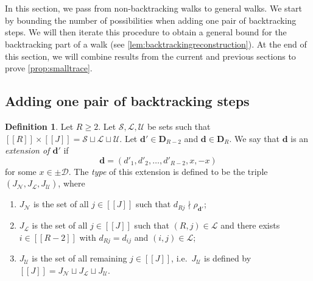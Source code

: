 \documentclass[11pt]{amsart}
\theoremstyle{definition}
\newtheorem{definition}[theorem]{Definition}
\renewcommand{\geq}{\geqslant}
\newcommand{\sinterval}[1]{[\![#1]\!] }
\newcommand{\D}{\mathcal{D}}
\renewcommand{\d}{\boldsymbol{d}}
\newcommand{\pcomp}[2]{d_{#1#2}}
\newcommand{\fprod}[1]{\rho_{#1}}
\newcommand{\pallprime}{\fprod{\d'}}
\newcommand{\lit}{\mathcal{L}}
\newcommand{\unlit}{\mathcal{U}}
\newcommand{\s}{\mathcal{S}}
\newcommand{\new}{\mathcal{N}}
\newcommand{\fancyD}{\mathbf{D}}
\newcommand{\Dsfmix}[1]{\fancyD_{\!#1}}
\newcommand{\newR}{\sinterval{J}}
\newcommand{\tupsize}{R}
\begin{document}



\section{}
\label{sec:backtrackingconclusion}


In this section, we pass from non-backtracking walks to general walks. We start by bounding the number of possibilities when adding one pair of backtracking steps. We will then iterate this procedure to obtain a general bound for the backtracking part of a walk (see \cref{lem:backtrackingreconstruction}). At the end of this section, we will combine results from the current and previous sections to prove \cref{prop:smalltrace}.


\subsection{Adding one pair of backtracking steps}


\begin{definition}
\label{def:extension}
Let $\tupsize \geq 2$. Let $\s,\lit,\unlit$ be sets such that $\sinterval{\tupsize}\times \newR = \s\sqcup \lit\sqcup \unlit$. Let $\d'\in \Dsfmix{\tupsize-2}$ and $\d\in \Dsfmix{\tupsize}$.
We say that $\d$ is an \emph{extension of $\d'$} if 
\begin{equation*}
	\d = (d'_1, d'_2, \ldots, d'_{\tupsize-2}, x, -x)
\end{equation*}
for some $x\in \pm \D$. The \emph{type} of this extension is defined to be the triple $(J_{\new}, J_{\lit}, J_{\unlit})$, where 
\begin{enumerate}
	\item $J_{\new}$ is the set of all $j\in \newR$ such that $\pcomp{\tupsize}{j} \nmid \pallprime$;
	\item $J_{\lit}$ is the set of all $j\in \newR$ such that $(\tupsize, j)\in \lit$ and there exists $i\in \sinterval{\tupsize-2}$ with $\pcomp{\tupsize}{j} = \pcomp{i}{j}$ and $(i,j)\in \lit$;
	\item $J_{\unlit}$ is the set of all remaining $j\in \newR$, i.e.~$J_{\unlit}$ is defined by $\newR = J_{\new} \sqcup J_{\lit}\sqcup J_{\unlit}$.
\end{enumerate}
\end{definition}
\end{document}
